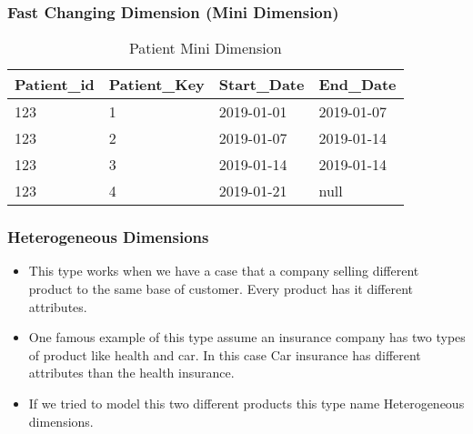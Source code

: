 \VideoClassification[column=1, colour=blue]
\begin{frame}
	\frametitle{Fast Changing Dimension (Mini Dimension)}

\begin{table}
	\begin{adjustbox}{max width=.7\textwidth}
		\begin{tabular}{| l | l | l | l |}
			\hline
			Patient\_id & Patient\_Key & Start\_Date & End\_Date\\
			\hline
			\hline		
			123 & 1   & 2019-01-01 & 2019-01-07\\
			123 & 2   & 2019-01-07 & 2019-01-14\\
			123 & 3   & 2019-01-14 & 2019-01-14\\
			123 & 4   & 2019-01-21 & null\\
			\hline
		\end{tabular}
	\end{adjustbox}
	\caption{Patient Mini Dimension}
\end{table}

\end{frame}
\begin{frame}
\frametitle{Heterogeneous Dimensions}
\begin{itemize}[<+->]
	
	\item This type works when we have a case that a company selling different product to the same base of customer. Every product has it different attributes. 
	\item One famous example of this type assume an insurance company has two types of product like health and car. In this case Car insurance has different attributes than the health insurance.
	\item If we tried to model this two different products this type name Heterogeneous dimensions. 
\end{itemize}
\end{frame}
